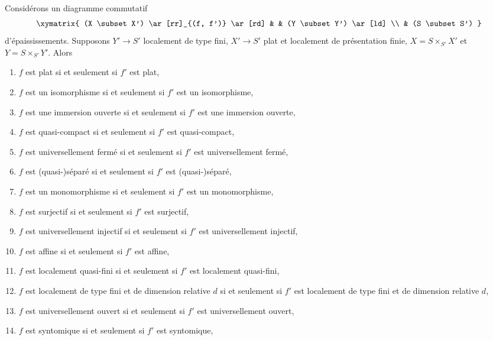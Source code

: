 \begin{lemma}
\label{lemma-deform-property-fp-over-ft}
Considérons un diagramme commutatif
$$
\xymatrix{
(X \subset X') \ar[rr]_{(f, f')} \ar[rd] & & (Y \subset Y') \ar[ld] \\
& (S \subset S')
}
$$
d'épaississements. Supposons $Y' \to S'$ localement de type fini,
$X' \to S'$ plat et localement de présentation finie,
$X = S \times_{S'} X'$ et $Y = S \times_{S'} Y'$. Alors
\begin{enumerate}
\item $f$ est plat si et seulement si $f'$ est plat,
\label{item-flat-fp-over-ft}
\item $f$ est un isomorphisme si et seulement si $f'$ est un isomorphisme,
\label{item-isomorphism-fp-over-ft}
\item $f$ est une immersion ouverte si et seulement si $f'$ est une immersion ouverte,
\label{item-open-immersion-fp-over-ft}
\item $f$ est quasi-compact si et seulement si $f'$ est quasi-compact,
\label{item-quasi-compact-fp-over-ft}
\item $f$ est universellement fermé si et seulement si $f'$ est universellement fermé,
\label{item-universally-closed-fp-over-ft}
\item $f$ est (quasi-)séparé si et seulement si $f'$ est (quasi-)séparé,
\label{item-separated-fp-over-ft}
\item $f$ est un monomorphisme si et seulement si $f'$ est un monomorphisme,
\label{item-monomorphism-fp-over-ft}
\item $f$ est surjectif si et seulement si $f'$ est surjectif,
\label{item-surjective-fp-over-ft}
\item $f$ est universellement injectif si et seulement si $f'$ est universellement injectif,
\label{item-universally-injective-fp-over-ft}
\item $f$ est affine si et seulement si $f'$ est affine,
\label{item-affine-fp-over-ft}
\item $f$ est localement quasi-fini si et seulement si $f'$ est localement quasi-fini,
\label{item-quasi-finite-fp-over-ft}
\item
\label{item-relative-dimension-d-fp-over-ft}
$f$ est localement de type fini et de dimension relative $d$ si et seulement si
$f'$ est localement de type fini et de dimension relative $d$,
\item $f$ est universellement ouvert si et seulement si $f'$ est universellement ouvert,
\label{item-universally-open-fp-over-ft}
\item $f$ est syntomique si et seulement si $f'$ est syntomique,

\end{enumerate}
\end{lemma}
